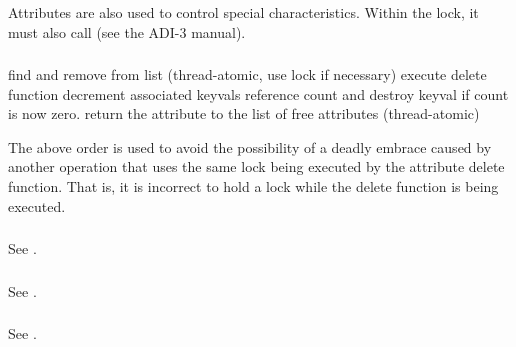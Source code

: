 \documentclass{article}
\begin{document}
Attributes are also used to control special characteristics.  Within
the lock, it must also call 
(see the ADI-3 manual).





\subsubsection{}
\begin{algorithm}
find and remove from list (thread-atomic, use lock if necessary)
execute delete function
decrement associated keyvals reference count and destroy keyval if
count is now zero.
return the attribute to the list of free attributes (thread-atomic)
\end{algorithm}
The above order is used to avoid the possibility of a deadly embrace
caused by another operation that uses the same lock being executed by
the attribute delete function.  That is, it is incorrect to hold a
lock while the delete function is being executed.

\subsubsection{}
See .

\subsubsection{}
See .

\subsubsection{}
See .
\end{document}
